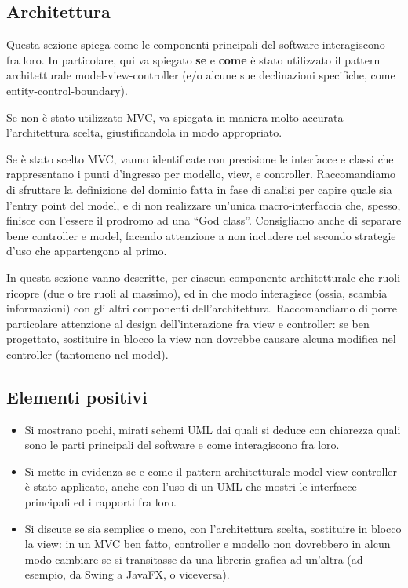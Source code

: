 \documentclass[a4paper,12pt]{report}
\begin{document}
\begin{itemize}
\section{Architettura}

Questa sezione spiega come le componenti principali del software interagiscono fra loro.
%
In particolare, qui va spiegato \textbf{se} e \textbf{come} è stato utilizzato il pattern
architetturale model-view-controller (e/o alcune sue declinazioni specifiche, come entity-control-boundary).

Se non è stato utilizzato MVC, va spiegata in maniera molto accurata l'architettura scelta, giustificandola in modo appropriato.

Se è stato scelto MVC, vanno identificate con precisione le interfacce e classi che rappresentano i punti d'ingresso per modello, view, e controller.
Raccomandiamo di sfruttare la definizione del dominio fatta in fase di analisi per capire quale sia l'entry point del model, e di non realizzare un'unica macro-interfaccia che, spesso, finisce con l'essere il prodromo ad una ``God class''.
%
Consigliamo anche di separare bene controller e model, facendo attenzione a non includere nel secondo strategie d'uso che appartengono al primo.

In questa sezione vanno descritte, per ciascun componente architetturale che ruoli ricopre (due o tre ruoli al massimo), ed in che modo interagisce (ossia, scambia informazioni) con gli altri componenti dell'architettura.
%
Raccomandiamo di porre particolare attenzione al design dell'interazione fra view e controller: se ben progettato, sostituire in blocco la view non dovrebbe causare alcuna modifica nel controller (tantomeno nel model).

\subsection*{Elementi positivi}
\begin{itemize}
 \item Si mostrano pochi, mirati schemi UML dai quali si deduce con chiarezza quali sono le parti principali del software e come interagiscono fra loro.
 \item Si mette in evidenza se e come il pattern architetturale model-view-controller è stato applicato, anche con l'uso di un UML che mostri le interfacce principali ed i rapporti fra loro.
 \item Si discute se sia semplice o meno, con l'architettura scelta, sostituire in blocco la view:
 	in un MVC ben fatto, controller e modello non dovrebbero in alcun modo cambiare se si transitasse da una libreria grafica ad un'altra (ad esempio, da Swing a JavaFX, o viceversa).
\end{itemize}


\end{itemize}
\end{document}
